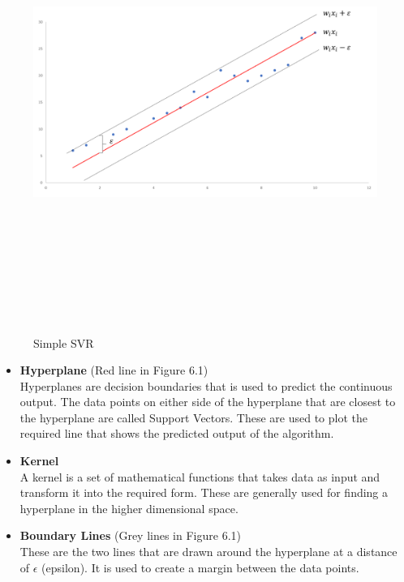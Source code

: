 \begin{figure}[h]
\centering
\includegraphics[width=1\textwidth, height=15cm]{./figures/svm.png}
\caption{Simple SVR}
\label{fig1}
\end{figure}

\begin{itemize}
    \item \textbf{Hyperplane} (Red line in Figure 6.1) \\ Hyperplanes are decision boundaries that is used to predict the continuous output. The data points on either side of the hyperplane that are closest to the hyperplane are called Support Vectors. These are used to plot the required line that shows the predicted output of the algorithm.
    \item \textbf{Kernel} \\ A kernel is a set of mathematical functions that takes data as input and transform it into the required form. These are generally used for finding a hyperplane in the higher dimensional space.
    \item \textbf{Boundary Lines} (Grey lines in Figure 6.1) \\ These are the two lines that are drawn around the hyperplane at a distance of \textbf{$\epsilon$} (epsilon). It is used to create a margin between the data points.
\end{itemize}

